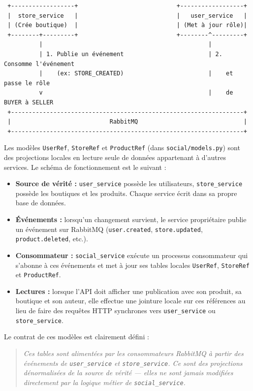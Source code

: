 \documentclass[11pt,a4paper]{article}
\begin{document}
\begin{verbatim}
 +------------------+                            +------------------+
 |  store_service   |                            |   user_service   |
 | (Crée boutique)  |                            | (Met à jour rôle)|
 +--------+---------+                            +--------^---------+
          |                                               |
          | 1. Publie un événement                        | 2. Consomme l'événement
          |    (ex: STORE_CREATED)                        |    et passe le rôle
          v                                               |    de BUYER à SELLER
 +------------------------------------------------------------------+
 |                            RabbitMQ                              |
 +------------------------------------------------------------------+
\end{verbatim}


Les modèles \texttt{UserRef}, \texttt{StoreRef} et \texttt{ProductRef} (dans \texttt{social/models.py}) sont des projections locales en lecture seule de données appartenant à d'autres services. Le schéma de fonctionnement est le suivant :

\begin{itemize}
  \item \textbf{Source de vérité :} \texttt{user\_service} possède les utilisateurs, \texttt{store\_service} possède les boutiques et les produits. Chaque service écrit dans sa propre base de données.
  \item \textbf{Événements :} lorsqu'un changement survient, le service propriétaire publie un événement sur RabbitMQ (\texttt{user.created}, \texttt{store.updated}, \texttt{product.deleted}, etc.).
  \item \textbf{Consommateur :} \texttt{social\_service} exécute un processus consommateur qui s'abonne à ces événements et met à jour ses tables locales \texttt{UserRef}, \texttt{StoreRef} et \texttt{ProductRef}.
  \item \textbf{Lectures :} lorsque l'API doit afficher une publication avec son produit, sa boutique et son auteur, elle effectue une jointure locale sur ces références au lieu de faire des requêtes HTTP synchrones vers \texttt{user\_service} ou \texttt{store\_service}.
\end{itemize}

Le contrat de ces modèles est clairement défini :
\begin{quote}
\textit{Ces tables sont alimentées par les consommateurs RabbitMQ à partir des événements de \texttt{user\_service} et \texttt{store\_service}. Ce sont des projections dénormalisées de la source de vérité — elles ne sont jamais modifiées directement par la logique métier de \texttt{social\_service}.}
\end{quote}
\end{document}
